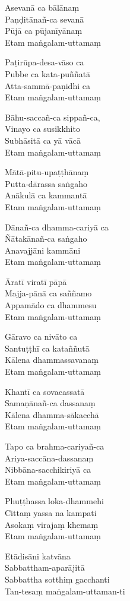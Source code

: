 \begin{paritta}
Asevanā ca bālānaṃ\\
Paṇḍitānañ-ca sevanā\\
Pūjā ca pūjanīyānaṃ\\
Etam maṅgalam-uttamaṃ

Paṭirūpa-desa-vāso ca\\
Pubbe ca kata-puññatā\\
Atta-sammā-paṇidhi ca\\
Etam maṅgalam-uttamaṃ

Bāhu-saccañ-ca sippañ-ca,\\
Vinayo ca susikkhito\\
Subhāsitā ca yā vācā\\
Etam maṅgalam-uttamaṃ

Mātā-pitu-upaṭṭhānaṃ\\
Putta-dārassa saṅgaho\\
Anākulā ca kammantā\\
Etam maṅgalam-uttamaṃ

Dānañ-ca dhamma-cariyā ca\\
Ñātakānañ-ca saṅgaho\\
Anavajjāni kammāni\\
Etam maṅgalam-uttamaṃ

Āratī viratī pāpā\\
Majja-pānā ca saññamo\\
Appamādo ca dhammesu\\
Etam maṅgalam-uttamaṃ

Gāravo ca nivāto ca\\
Santuṭṭhī ca kataññutā\\
Kālena dhammassavanaṃ\\
Etam maṅgalam-uttamaṃ

Khantī ca sovacassatā\\
Samaṇānañ-ca dassanaṃ\\
Kālena dhamma-sākacchā\\
Etam maṅgalam-uttamaṃ

Tapo ca brahma-cariyañ-ca\\
Ariya-saccāna-dassanaṃ\\
Nibbāna-sacchikiriyā ca\\
Etam maṅgalam-uttamaṃ

Phuṭṭhassa loka-dhammehi\\
Cittaṃ yassa na kampati\\
Asokaṃ virajaṃ khemaṃ\\
Etam maṅgalam-uttamaṃ

Etādisāni katvāna\\
Sabbattham-aparājitā\\
Sabbattha sotthiṃ gacchanti\\
Tan-tesaṃ maṅgalam-uttaman-ti

\end{paritta}

